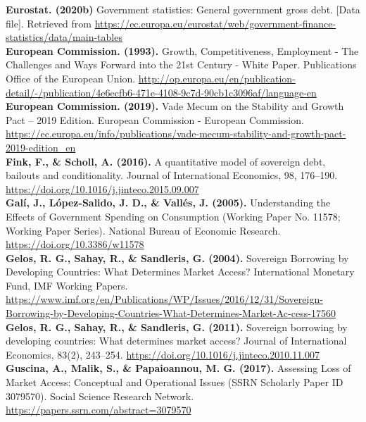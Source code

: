 \textbf{Eurostat. (2020b)} Government statistics: General government gross debt. [Data file]. Retrieved from \url{https://ec.europa.eu/eurostat/web/government-finance-statistics/data/main-tables}\\

\textbf{European Commission. (1993).} Growth, Competitiveness, Employment - The Challenges and Ways Forward into the 21st Century - White Paper. Publications Office of the European Union. \url{http://op.europa.eu/en/publication-detail/-/publication/4e}\linebreak\url{6ecfb6-471e-4108-9c7d-90cb1c3096af/language-en}\\

\textbf{European Commission. (2019).} Vade Mecum on the Stability and Growth Pact – 2019 Edition. European Commission - European Commission. \url{https://ec.europa.eu/info/publications/vade-mecum-stability-and-growth-pact-2019-edition\_en}\\

\textbf{Fink, F., \& Scholl, A. (2016).} A quantitative model of sovereign debt, bailouts and conditionality. Journal of International Economics, 98, 176–190. \url{https://doi.org/10.1016/j.jinteco.2015.09.007}\\

\textbf{Galí, J., López-Salido, J. D., \& Vallés, J. (2005).} Understanding the Effects of Government Spending on Consumption (Working Paper No. 11578; Working Paper Series). National Bureau of Economic Research. \url{https://doi.org/10.3386/w11578}\\

\textbf{Gelos, R. G., Sahay, R., \& Sandleris, G. (2004).} Sovereign Borrowing by Developing Countries: What Determines Market Access? International Monetary Fund, IMF Working Papers. \url{https://www.imf.org/en/Publications/WP/Issues/2016/12/31/Sovereign-Borrowing-by-Developing-Countries-What-Determines-Market-Ac-}\linebreak\url{cess-17560}\\
\clearpage
\textbf{Gelos, R. G., Sahay, R., \& Sandleris, G. (2011).} Sovereign borrowing by developing countries: What determines market access? Journal of International Economics, 83(2), 243–254. \url{https://doi.org/10.1016/j.jinteco.2010.11.007}\\

\textbf{Guscina, A., Malik, S., \& Papaioannou, M. G. (2017).} Assessing Loss of Market Access: Conceptual and Operational Issues (SSRN Scholarly Paper ID 3079570). Social Science Research Network. \url{https://papers.ssrn.com/abstract=3079570}\\

